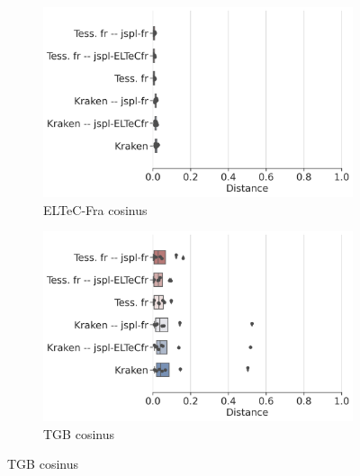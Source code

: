 \begin{figure}[h!]
   \centering
         \begin{subfigure}{0.45\textwidth}
  \includegraphics[height=.65\textwidth]{IMAGES/Boite-moustache/ELTeC-Fra_REF_cosinus.png} 
        \caption{ELTeC-Fra cosinus}
   \end{subfigure}
    \begin{subfigure}{0.5\textwidth}
  \includegraphics[height=.65\textwidth]{IMAGES/Boite-moustache/TGB_REF_cosinus.png} 
        \caption{TGB cosinus}
   \end{subfigure}
   

\end{figure}
